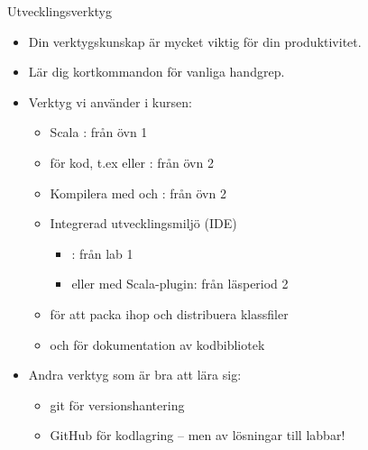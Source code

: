 \begin{Slide}{Utvecklingsverktyg}
\begin{itemize}
\item Din verktygskunskap är mycket viktig för din produktivitet.
\item Lär dig kortkommandon för vanliga handgrep.
\item Verktyg vi använder i kursen:
\begin{itemize}
\item Scala : från övn 1
\item {} för kod, t.ex  eller : från övn 2
\item Kompilera med  och : från övn 2
\item Integrerad utvecklingsmiljö (IDE)
\begin{itemize}
\item {}: från lab 1
\item {} eller  med Scala-plugin: från läsperiod 2
\end{itemize}
\item {} för att packa ihop och distribuera klassfiler
\item {} och  för dokumentation av kodbibliotek
\end{itemize}
\item Andra verktyg som är bra att lära sig:
\begin{itemize}
\item git för versionshantering
\item GitHub för kodlagring -- men  av lösningar till labbar!
\end{itemize}
\end{itemize}
\end{Slide}


\ifkompendium\else  %

